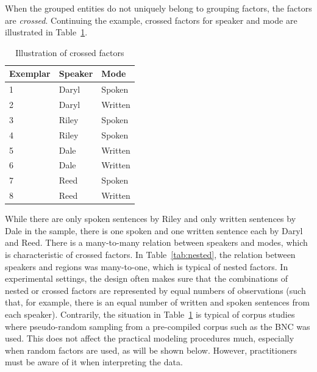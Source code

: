 \documentclass[a4paper,12pt]{article}
\begin{document}
When the grouped entities do not uniquely belong to grouping factors, the factors are \textit{crossed}.
Continuing the example, crossed factors for speaker and mode are illustrated in Table~\ref{tab:crossed}.
%
\begin{table}
  \centering
  \begin{tabular}{lll}
    \toprule
    \textbf{Exemplar} & \textbf{Speaker}  & \textbf{Mode}   \\
    \midrule
                    1 &           Daryl  &         Spoken  \\
                    2 &           Daryl  &         Written \\
                    3 &           Riley  &         Spoken  \\
                    4 &           Riley  &         Spoken  \\
                    5 &           Dale   &         Written \\
                    6 &           Dale   &         Written \\
                    7 &           Reed   &         Spoken  \\
                    8 &           Reed   &         Written \\
    \bottomrule
  \end{tabular}
  \caption{Illustration of crossed factors}
  \label{tab:crossed}
\end{table}
%
While there are only spoken sentences by Riley and only written sentences by Dale in the sample, there is one spoken and one written sentence each by Daryl and Reed.
There is a many-to-many relation between speakers and modes, which is characteristic of crossed factors.
In Table~\ref{tab:nested}, the relation between speakers and regions was many-to-one, which is typical of nested factors.
In experimental settings, the design often makes sure that the combinations of nested or crossed factors are represented by equal numbers of observations (such that, for example, there is an equal number of written and spoken sentences from each speaker).
Contrarily, the situation in Table~\ref{tab:crossed} is typical of corpus studies where pseudo-random sampling from a pre-compiled corpus such as the BNC was used.
This does not affect the practical modeling procedures much, especially when random factors are used, as will be shown below.
However, practitioners must be aware of it when interpreting the data.
\end{document}
